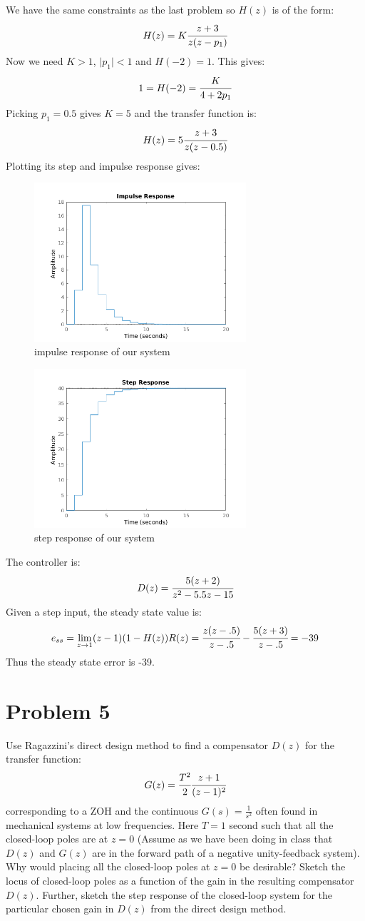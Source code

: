 \documentclass{article}
\begin{document}
We have the same constraints as the last problem so $H(z)$ is of the form:
\[H(z)=K\cfrac{z+3}{z(z-p_1)}\]
Now we need $K>1$, $\lvert p_1\rvert<1$ and $H(-2)=1$. This gives:
\[1=H(-2)=\cfrac{K}{4+2p_1}\]
Picking $p_1=0.5$ gives $K=5$ and the transfer function is:
\[H(z)=5\cfrac{z+3}{z(z-0.5)}\]
Plotting its step and impulse response gives:
\begin{figure}[H]
    \centering
    \includegraphics[width=0.7\textwidth]{PR4_impulse.png}
    \caption{impulse response of our system}
\end{figure}
\begin{figure}[H]
    \centering
    \includegraphics[width=0.7\textwidth]{PR4_step.png}
    \caption{step response of our system}
\end{figure}
The controller is:
\[D(z)=\cfrac{5(z+2)}{z^2-5.5z-15}\]
Given a step input, the steady state value is:
\[e_{ss}=\lim_{z\to1}(z-1)(1-H(z))R(z)=\cfrac{z(z-.5)}{z-.5}-\cfrac{5(z+3)}{z-.5}=-39\]
Thus the steady state error is -39.
\section*{Problem 5}
Use Ragazzini's direct design method to find a compensator $D(z)$ for the transfer function:
\[G(z)=\cfrac{T^2}{2}\cfrac{z+1}{(z-1)^2}\]
corresponding to a ZOH and the continuous $G(s)=\frac{1}{s^2}$ often found in mechanical systems at low frequencies. Here $T=1$ second such that all the closed-loop poles are at $z=0$ (Assume as we have been doing in class that $D(z)$ and $G(z)$ are in the forward path of a negative unity-feedback system). Why would placing all the closed-loop poles at $z=0$ be desirable? Sketch the locus of closed-loop poles as a function of the gain in the resulting compensator $D(z)$. Further, sketch
the step response of the closed-loop system for the particular chosen gain in $D(z)$ from the direct design method.\\
\end{document}
